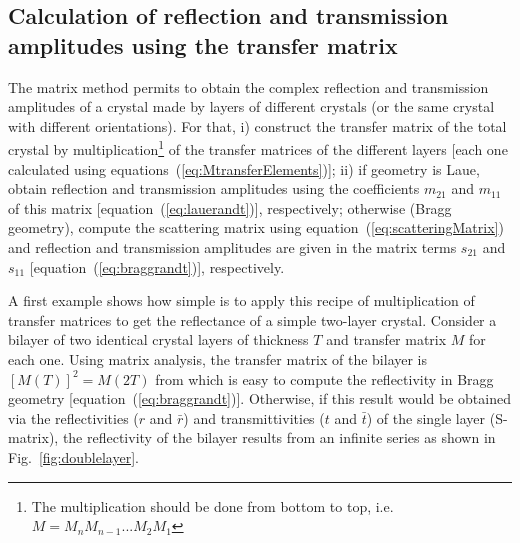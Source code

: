 \documentclass{iucr}
\begin{document}
\subsection{Calculation of reflection and transmission amplitudes using the transfer matrix}

The matrix method permits to obtain the complex reflection and transmission amplitudes of a crystal made by layers of different crystals (or the same crystal with different orientations). For that,
i) construct the transfer matrix of the total crystal by multiplication\footnote{The multiplication should be done from bottom to top, i.e. $M=M_n M_{n-1}...M_2 M_1$}
of the transfer matrices of the different layers [each one calculated using equations~(\ref{eq:MtransferElements})];
ii) if geometry is Laue, obtain reflection and transmission amplitudes using the coefficients $m_{21}$ and $m_{11}$ of this matrix [equation~(\ref{eq:lauerandt})], respectively; otherwise (Bragg geometry), compute the scattering matrix using equation~(\ref{eq:scatteringMatrix}) and reflection and transmission amplitudes are given in the matrix terms $s_{21}$ and $s_{11}$ [equation~(\ref{eq:braggrandt})], respectively.

A first example shows how simple is to apply this recipe of multiplication of transfer matrices to get the reflectance of a simple two-layer crystal. Consider
a bilayer of two identical crystal layers of thickness $T$ and transfer matrix $M$ for each one. Using matrix analysis, the transfer matrix of the bilayer is $[M(T)]^2=M(2T)$ from which is easy to compute the reflectivity in Bragg geometry [equation~(\ref{eq:braggrandt})]. Otherwise, if this result would be obtained via the reflectivities ($r$ and $\bar{r}$) and transmittivities ($t$ and $\bar{t}$) of the single layer (S-matrix), the reflectivity of the bilayer results from an infinite series as shown in  Fig.~\ref{fig:doublelayer}.
 
\end{document}
